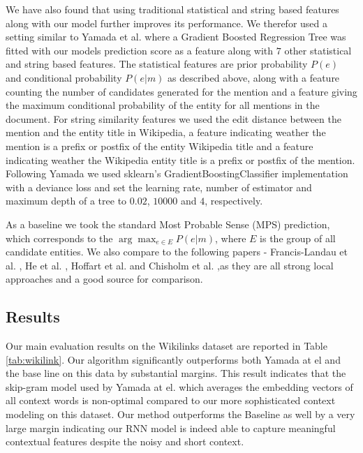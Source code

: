 \documentclass[11pt]{article}
\begin{document}
We have also found that using traditional statistical and string based features along with our model further improves its performance. We therefor used a setting similar to Yamada et al.  where a Gradient Boosted Regression Tree was fitted with our models prediction score as a feature along with $7$ other statistical and string based features. The statistical features are prior probability $P(e)$ and conditional probability $P(e|m)$ as described above, along with a feature counting the number of candidates generated for the mention and a feature giving the maximum conditional probability of the entity for all mentions in the document. For string similarity features we used the edit distance between the mention and the entity title in Wikipedia, a feature indicating weather the mention is a prefix or postfix of the entity Wikipedia title and a feature indicating weather the Wikipedia entity title is a prefix or postfix of the mention. Following Yamada we used sklearn's GradientBoostingClassifier implementation \cite{pedregosa2011scikit} with a deviance loss and set the learning rate, number of estimator and maximum depth of a tree to $0.02$, $10000$ and $4$, respectively. 

As a baseline we took the standard Most Probable Sense (MPS) prediction, which corresponds to the $\arg\max_{e\in{{E}}}{P(e|m)}$, where $E$ is the group of all candidate entities.
We also compare to the following papers - Francis-Landau et al. , He et al. , Hoffart et al.  and Chisholm et al.  ,as they are all strong local approaches and a good source for comparison.

\subsection{Results}

Our main evaluation results on the Wikilinks dataset are reported in Table \ref{tab:wikilink}. Our algorithm significantly outperforms both Yamada at el and the base line on this data by substantial margins. This result indicates that the skip-gram model used by Yamada at el. which averages the embedding vectors of all context words is non-optimal compared to our more sophisticated context modeling on this dataset. Our method outperforms the Baseline as well by a very large margin indicating our RNN model is indeed able to capture meaningful contextual features despite the noisy and short context.
\end{document}
